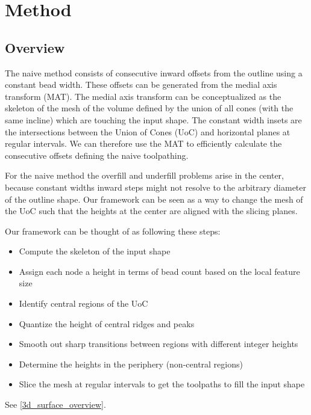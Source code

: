 \section{Method}
\subsection{Overview}
The naive method consists of consecutive inward offsets from the outline using a constant bead width.
These offsets can be generated from the medial axis transform (MAT).
The medial axis transform can be conceptualized as the skeleton of the mesh of the volume defined by the union of all cones (with the same incline) which are touching the input shape. \cite{blum1967transformation}
The constant width insets are the intersections between the Union of Cones (UoC) and horizontal planes at regular intervals.
We can therefore use the MAT to efficiently calculate the consecutive offsets defining the naive toolpathing. \cite{eiamsa2003toward}

For the naive method the overfill and underfill problems arise in the center,
because constant widths inward steps might not resolve to the arbitrary diameter of the outline shape.
Our framework can be seen as a way to change the mesh of the UoC such that the heights at the center are aligned with the slicing planes.

Our framework can be thought of as following these steps:
\begin{itemize}
\item Compute the skeleton of the input shape
\item Assign each node a height in terms of bead count based on the local feature size
\item Identify central regions of the UoC
\item Quantize the height of central ridges and peaks
\item Smooth out sharp transitions between regions with different integer heights
\item Determine the heights in the periphery (non-central regions)
\item Slice the mesh at regular intervals to get the toolpaths to fill the input shape
\end{itemize}
See \cref{3d_surface_overview}.






